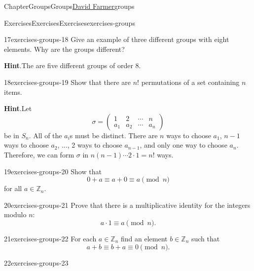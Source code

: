 \documentclass[oneside,10pt,]{book}
\newcommand{\blocktitlefont}{\relax}
\numberwithin{equation}{section}
\begin{document}
\begin{chapterptx}{Chapter}{Groups}{}{Groups}{\hyperlink{dfarmer}{David Farmer}}{}{groups}
\begin{exercises-section}{Exercises}{Exercises}{}{Exercises}{}{}{exercises-groups}
\begin{divisionexercise}{17}{}{}{exercises-groups-18}%
Give an example of three different groups with eight elements. Why are the groups different?%
\par\smallskip%
\noindent\textbf{\blocktitlefont Hint}.\hypertarget{exercises-groups-18-2}{}\quad{}The are five different groups of order 8.%
\end{divisionexercise}%
\begin{divisionexercise}{18}{}{}{exercises-groups-19}%
Show that there are \(n!\) permutations of a set containing \(n\) items.%
\par\smallskip%
\noindent\textbf{\blocktitlefont Hint}.\hypertarget{exercises-groups-19-2}{}\quad{}Let%
\begin{equation*}
\sigma =
\begin{pmatrix}
1 & 2 & \cdots & n \\ a_1 & a_2 & \cdots & a_n
\end{pmatrix}
\end{equation*}
be in \(S_n\). All of the \(a_i\)s must be distinct. There are \(n\) ways to choose \(a_1\), \(n-1\) ways to choose \(a_2\), \(\ldots\), 2 ways to choose \(a_{n - 1}\), and only one way to choose \(a_n\). Therefore, we can form \(\sigma\) in \(n(n - 1) \cdots 2 \cdot 1 = n!\) ways.%
\end{divisionexercise}%
\begin{divisionexercise}{19}{}{}{exercises-groups-20}%
Show that%
\begin{equation*}
0 + a  \equiv a + 0  \equiv a \pmod{ n }
\end{equation*}
for all \(a \in {\mathbb Z}_n\).%
\end{divisionexercise}%
\begin{divisionexercise}{20}{}{}{exercises-groups-21}%
Prove that there is  a multiplicative identity for the integers modulo \(n\):%
\begin{equation*}
a \cdot  1   \equiv  a \pmod{n}.
\end{equation*}
%
\end{divisionexercise}%
\begin{divisionexercise}{21}{}{}{exercises-groups-22}%
For each \(a \in {\mathbb Z}_n\) find an element \(b \in {\mathbb Z}_n\) such that%
\begin{equation*}
a + b \equiv b + a  \equiv 0 \pmod{ n}.
\end{equation*}
%
\end{divisionexercise}%
\begin{divisionexercise}{22}{}{}{exercises-groups-23}%

\end{divisionexercise}
\end{exercises-section}
\end{chapterptx}
\end{document}
